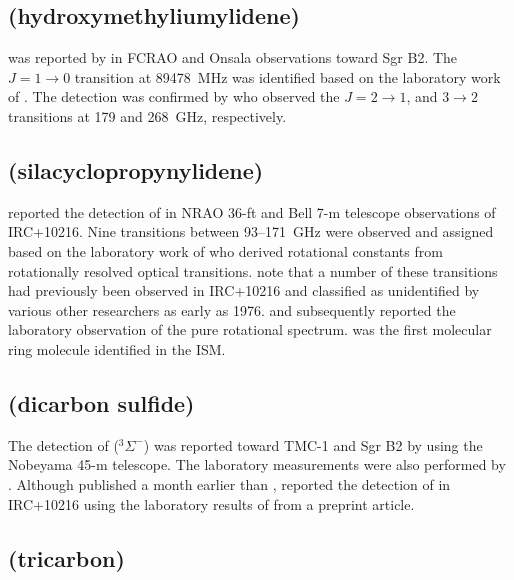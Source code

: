 \documentclass[twocolumn]{aastex631}
\begin{document}
	\subsection{ (hydroxymethyliumylidene) }
	\label{HOC+}
	
	 was reported by \citet{Woods:1983va} in FCRAO and Onsala observations toward Sgr B2.  The $J = 1\rightarrow0$ transition at 89478~MHz was identified based on the laboratory work of \citet{Gudeman:1982yt}.  The detection was confirmed by \citet{Ziurys:1995mh} who observed the $J = 2\rightarrow1$, and $3\rightarrow2$ transitions at 179 and 268~GHz, respectively.
	
	\subsection{ (silacyclopropynylidene)}
	\label{SiC2}
	
	\citet{Thaddeus:1984fn} reported the detection of  in NRAO 36-ft and Bell 7-m telescope observations of IRC+10216.  Nine transitions between 93--171~GHz were observed and assigned based on the laboratory work of \citet{Michalopoulos:1984iy} who derived rotational constants from rotationally resolved optical transitions.  \citet{Thaddeus:1984fn} note that a number of these transitions had previously been observed in IRC+10216 and classified as unidentified by various other researchers as early as 1976. \citet{Suenram:1989co} and \citet{Gottlieb:1989cr} subsequently reported the laboratory observation of the pure rotational spectrum.  was the first molecular ring molecule identified in the ISM.
	
	\subsection{ (dicarbon sulfide)}
	\label{C2S}
	
	The detection of  ($^3\Sigma ^-$) was reported toward TMC-1 and Sgr B2 by \citet{Saito:1987fa} using the Nobeyama 45-m telescope.  The laboratory measurements were also performed by \citet{Saito:1987fa}. Although published a month earlier than \citet{Saito:1987fa}, \citet{Cernicharo:1987jh} reported the detection of  in IRC+10216 using the laboratory results of \citet{Saito:1987fa} from a preprint article.
	
	\subsection{ (tricarbon)}
	\label{C3}
	
\end{document}
